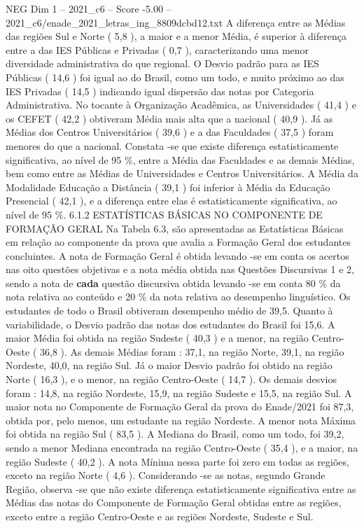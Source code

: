 \begin{textsample}{NEG Dim 1 – 2021\_c6 – Score -5.00 – 2021\_c6/enade\_2021\_letras\_ing\_8809dcbd12.txt}
A diferença entre as Médias das regiões Sul e Norte ( 5,8 ), a maior e a menor Média, é superior à diferença entre a das IES Públicas e Privadas ( 0,7 ), caracterizando uma menor diversidade administrativa do que regional.
O Desvio padrão para as IES Públicas ( 14,6 ) foi igual ao do Brasil, como um todo, e muito próximo ao das IES Privadas ( 14,5 ) indicando igual dispersão das notas por Categoria Administrativa.
No tocante à Organização Acadêmica, as Universidades ( 41,4 ) e os CEFET ( 42,2 ) obtiveram Média mais alta que a nacional ( 40,9 ).
Já as Médias dos Centros Universitários ( 39,6 ) e a das Faculdades ( 37,5 ) foram menores do que a nacional.
Constata -se que existe diferença estatisticamente significativa, ao nível de 95 \%, entre a Média das Faculdades e as demais Médias, bem como entre as Médias de Universidades e Centros Universitários.
A Média da Modalidade Educação a Distância ( 39,1 ) foi inferior à Média da Educação Presencial ( 42,1 ), e a diferença entre elas é estatisticamente significativa, ao nível de 95 \%. 6.1.2 ESTATÍSTICAS BÁSICAS NO COMPONENTE DE FORMAÇÃO GERAL Na Tabela 6.3, são apresentadas as Estatísticas Básicas em relação ao componente da prova que avalia a Formação Geral dos estudantes concluintes.
A nota de Formação Geral é obtida levando -se em conta os acertos nas oito questões objetivas e a nota média obtida nas Questões Discursivas 1 e 2, sendo a nota de \textbf{cada} questão discursiva obtida levando -se em conta 80 \% da nota relativa ao conteúdo e 20 \% da nota relativa ao desempenho linguístico.
Os estudantes de todo o Brasil obtiveram desempenho médio de 39,5.
Quanto à variabilidade, o Desvio padrão das notas dos estudantes do Brasil foi 15,6.
A maior Média foi obtida na região Sudeste ( 40,3 ) e a menor, na região Centro-Oeste ( 36,8 ).
As demais Médias foram : 37,1, na região Norte, 39,1, na região Nordeste, 40,0, na região Sul.
Já o maior Desvio padrão foi obtido na região Norte ( 16,3 ), e o menor, na região Centro-Oeste ( 14,7 ).
Os demais desvios foram : 14,8, na região Nordeste, 15,9, na região Sudeste e 15,5, na região Sul.
A maior nota no Componente de Formação Geral da prova do Enade/2021 foi 87,3, obtida por, pelo menos, um estudante na região Nordeste.
A menor nota Máxima foi obtida na região Sul ( 83,5 ).
A Mediana do Brasil, como um todo, foi 39,2, sendo a menor Mediana encontrada na região Centro-Oeste ( 35,4 ), e a maior, na região Sudeste ( 40,2 ).
A nota Mínima nessa parte foi zero em todas as regiões, exceto na região Norte ( 4,6 ).
Considerando -se as notas, segundo Grande Região, observa -se que não existe diferença estatisticamente significativa entre as Médias das notas do Componente de Formação Geral obtidas entre as regiões, exceto entre a região Centro-Oeste e as regiões Nordeste, Sudeste e Sul.

\end{textsample}

